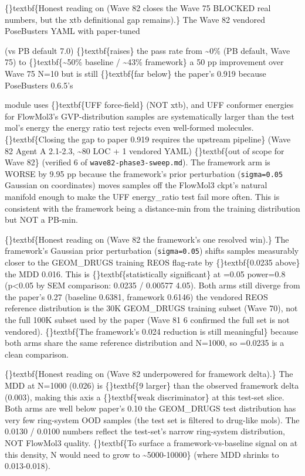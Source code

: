 \documentclass{article}
\begin{document}
\{\}textbf\{Honest reading on  (Wave 82 closes the Wave 75 BLOCKED  real numbers, but the xtb definitional gap remains).\} The Wave 82 vendored PoseBusters YAML with paper-tuned

 (vs PB default 7.0) \{\}textbf\{raises\} the pass rate from \textasciitilde{}0\% (PB default, Wave 75) to \{\}textbf\{\textasciitilde{}50\% baseline / \textasciitilde{}43\% framework\}  a 50 pp improvement over Wave 75 N=10  but is still \{\}textbf\{far below\} the paper's 0.919 because PoseBusters 0.6.5's

 module uses \{\}textbf\{UFF force-field\} (NOT xtb), and UFF conformer energies for FlowMol3's GVP-distribution samples are systematically larger than the test mol's energy  the energy ratio test rejects even well-formed molecules. \{\}textbf\{Closing the gap to paper 0.919 requires the upstream  pipeline\} (Wave 82 Agent A 2.1-2.3, \textasciitilde{}80 LOC + 1 vendored YAML)  \{\}textbf\{out of scope for Wave 82\} (verified 6 of \texttt{wave82-phase3-sweep.md}). The framework arm is WORSE by 9.95 pp because the framework's prior perturbation (\texttt{sigma=0.05} Gaussian on coordinates) moves samples off the FlowMol3 ckpt's natural manifold enough to make the UFF energy\_ratio test fail more often. This is consistent with the framework being a distance-min from the training distribution but NOT a PB-min.

\{\}textbf\{Honest reading on  (Wave 82  the framework's one resolved win).\} The framework's Gaussian prior perturbation (\texttt{sigma=0.05}) shifts samples measurably closer to the GEOM\_DRUGS training REOS flag-rate by \{\}textbf\{0.0235  above\} the MDD 0.016. This is \{\}textbf\{statistically significant\} at =0.05 power=0.8 (p<0.05 by SEM comparison: 0.0235 / 0.00577  4.05). Both arms still diverge from the paper's 0.27 (baseline 0.6381, framework 0.6146)  the vendored REOS reference distribution is the 30K GEOM\_DRUGS training subset (Wave 70), not the full 100K subset used by the paper (Wave 81 6 confirmed the full set is not vendored). \{\}textbf\{The framework's 0.024 reduction is still meaningful\} because both arms share the same reference distribution and N=1000, so =0.0235 is a clean comparison.

\{\}textbf\{Honest reading on  (Wave 82  underpowered for framework delta).\} The MDD at N=1000 (0.026) is \{\}textbf\{9 larger\} than the observed framework delta (0.003), making this axis a \{\}textbf\{weak discriminator\} at this test-set slice. Both arms are well below paper's 0.10  the GEOM\_DRUGS test distribution has very few ring-system OOD samples (the test set is filtered to drug-like mols). The 0.0130 / 0.0100 numbers reflect the test-set's narrow ring-system distribution, NOT FlowMol3 quality. \{\}textbf\{To surface a framework-vs-baseline signal on  at this density, N would need to grow to \textasciitilde{}5000-10000\} (where MDD shrinks to 0.013-0.018).
\end{document}
